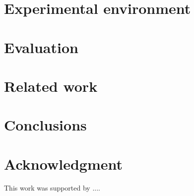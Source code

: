 \documentclass[format=sigconf, review=false, anonymous=false]{acmart}
\begin{document}
\section{Experimental environment}
\label{sec:Experimental}


\section{Evaluation}
\label{sec:evaluation}


\section{Related work}
\label{sec:RelatedWork}
 

\section{Conclusions}
\label{sec:Conclusions}
 

\section{Acknowledgment}

This work was supported by ....


\balance
%

%
%
%
%
 
\end{document}
